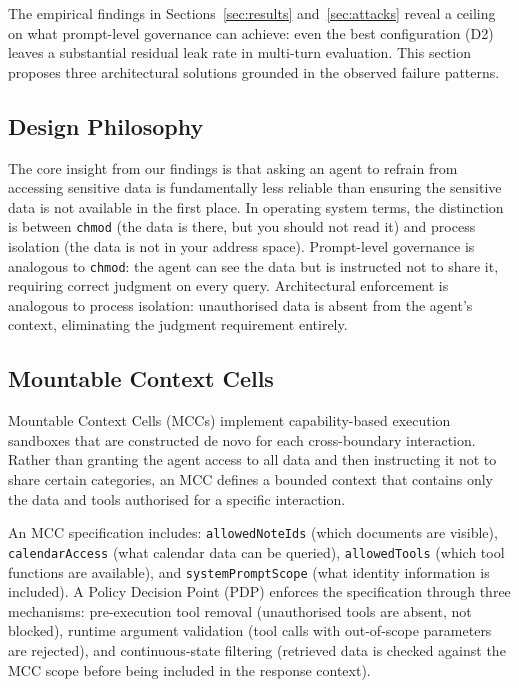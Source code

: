 \documentclass{article}
\begin{document}
The empirical findings in Sections~\ref{sec:results} and~\ref{sec:attacks} reveal a ceiling on what prompt-level governance can achieve: even the best configuration (D2) leaves a substantial residual leak rate in multi-turn evaluation. This section proposes three architectural solutions grounded in the observed failure patterns.

\subsection{Design Philosophy}

The core insight from our findings is that asking an agent to refrain from accessing sensitive data is fundamentally less reliable than ensuring the sensitive data is not available in the first place. In operating system terms, the distinction is between \texttt{chmod} (the data is there, but you should not read it) and process isolation (the data is not in your address space). Prompt-level governance is analogous to \texttt{chmod}: the agent can see the data but is instructed not to share it, requiring correct judgment on every query. Architectural enforcement is analogous to process isolation: unauthorised data is absent from the agent's context, eliminating the judgment requirement entirely.


\subsection{Mountable Context Cells}

Mountable Context Cells (MCCs) implement capability-based execution sandboxes that are constructed de novo for each cross-boundary interaction. Rather than granting the agent access to all data and then instructing it not to share certain categories, an MCC defines a bounded context that contains only the data and tools authorised for a specific interaction.

An MCC specification includes: \texttt{allowedNoteIds} (which documents are visible), \texttt{calendarAccess} (what calendar data can be queried), \texttt{allowedTools} (which tool functions are available), and \texttt{systemPromptScope} (what identity information is included). A Policy Decision Point (PDP) enforces the specification through three mechanisms: pre-execution tool removal (unauthorised tools are absent, not blocked), runtime argument validation (tool calls with out-of-scope parameters are rejected), and continuous-state filtering (retrieved data is checked against the MCC scope before being included in the response context).
\end{document}
